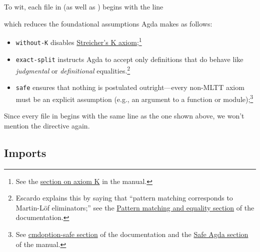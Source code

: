 \documentclass[a4paper,UKenglish,cleveref, autoref, thm-restate]{lipics-v2019}
\begin{document}
To wit, each file in \typetopology (as well as \agdaualib) begins with the line
\begin{code}
\>[0]\AgdaSymbol{\{-\#}\AgdaSpace{}%
\AgdaSpace{}%
\AgdaSpace{}%
\AgdaSpace{}%
\AgdaSpace{}%
\AgdaSymbol{\#-\}}\<%
\end{code}
which reduces the foundational assumptions Agda makes as follows:
\begin{itemize}
\item \texttt{without-K} disables \href{https://ncatlab.org/nlab/show/axiom+K+\%28type+theory\%29}{Streicher's K axiom};\footnote{See the \href{https://agda.readthedocs.io/en/v2.6.1/language/without-k.html}{section on axiom K} in the \agdalangref manual.}
\item \texttt{exact-split} instructs Agda to accept only definitions that do behave like \emph{judgmental} or \emph{definitional} equalities.\footnote{Escardo explains this by saying that ``pattern matching corresponds to Martin-Löf eliminators;'' see the \href{https://agda.readthedocs.io/en/v2.6.1/tools/command-line-options.html\#pattern-matching-and-equality}{Pattern matching and equality section} of the \agdatools documentation.}
\item \texttt{safe} ensures that nothing is postulated outright---every non-MLTT axiom must be an explicit assumption (e.g., an argument to a function or module);\footnote{See \href{https://agda.readthedocs.io/en/v2.6.1/tools/command-line-options.html\#cmdoption-safe}{cmdoption-safe section} of the \agdatools documentation and the \href{https://agda.readthedocs.io/en/v2.6.1/language/safe-agda.html\#safe-agda}{Safe Agda section} of the \agdalangref manual.}
\end{itemize}
Since every file in \agdaualib begins with the same  line as the one shown above, we won't mention the  directive again.

\subsection{Imports}\label{imports}
\end{document}
